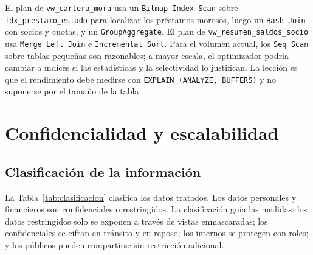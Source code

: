 \begin{table}[H]
  \centering
  \caption{Rendimiento de las vistas críticas}
  \label{tab:rendimiento}
\end{table}

El plan de \texttt{vw\_cartera\_mora} usa un \texttt{Bitmap Index Scan} sobre
\texttt{idx\_prestamo\_estado} para localizar los préstamos morosos, luego un
\texttt{Hash Join} con socios y cuotas, y un \texttt{GroupAggregate}. El plan
de \texttt{vw\_resumen\_saldos\_socio} usa \texttt{Merge Left Join} e
\texttt{Incremental Sort}. Para el volumen actual, los \texttt{Seq Scan} sobre
tablas pequeñas son razonables; a mayor escala, el optimizador podría cambiar
a índices si las estadísticas y la selectividad lo justifican. La lección es
que el rendimiento debe medirse con \texttt{EXPLAIN (ANALYZE, BUFFERS)} y no
suponerse por el tamaño de la tabla.

\section{Confidencialidad y escalabilidad}

\subsection{Clasificación de la información}

La Tabla~\ref{tab:clasificacion} clasifica los datos tratados. Los datos
personales y financieros son confidenciales o restringidos. La clasificación
guía las medidas: los datos restringidos solo se exponen a través de vistas
enmascaradas; los confidenciales se cifran en tránsito y en reposo; los
internos se protegen con roles; y los públicos pueden compartirse sin
restricción adicional.

